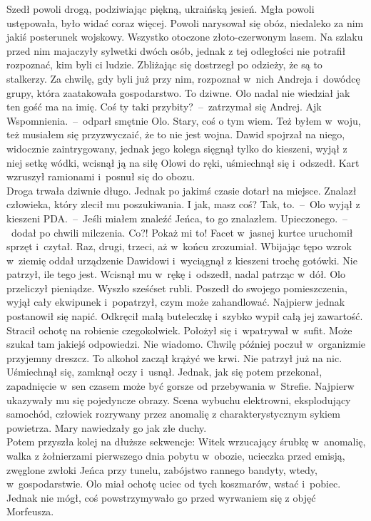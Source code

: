 \documentclass[../MAIN.tex]{subfiles}
\begin{document}
Szedł powoli drogą, podziwiając piękną, ukraińską jesień. Mgła powoli ustępowała, było widać coraz więcej. Powoli narysował się obóz, niedaleko za nim jakiś posterunek wojskowy. Wszystko otoczone złoto-czerwonym lasem. Na szlaku przed nim majaczyły sylwetki dwóch osób, jednak z tej odległości nie potrafił rozpoznać, kim byli ci ludzie. Zbliżając się dostrzegł po odzieży, że są to stalkerzy. Za chwilę, gdy byli już przy nim, rozpoznał w~nich Andreja i~dowódcę grupy, która zaatakowała gospodarstwo. To dziwne. Olo nadal nie wiedział jak ten gość ma na imię.
\sd
\xx Coś ty taki przybity?~--~zatrzymał się Andrej.
\xx Aj\3k Wspomnienia.~--~odparł smętnie Olo.
\xx Stary, coś o tym wiem. Też byłem w~woju, też musiałem się przyzwyczaić, że to nie jest wojna.
\qm
Dawid spojrzał na niego, widocznie zaintrygowany, jednak jego
kolega sięgnął tylko do kieszeni, wyjął z niej setkę wódki,
wcisnął ją na siłę Olowi do ręki, uśmiechnął się i~odszedł.
Kart wzruszył ramionami i~posnuł się do obozu.\\
Droga trwała dziwnie długo. Jednak po jakimś czasie dotarł na
miejsce. Znalazł człowieka, który zlecił mu poszukiwania.
\sd
\xx I jak, masz coś?
\xx Tak, to.~--~Olo wyjął z kieszeni PDA.~--~Jeśli miałem znaleźć Jeńca, to go znalazłem. Upieczonego.~--~dodał po chwili milczenia.
\xx Co?! Pokaż mi to!
\qm
Facet w~jasnej kurtce uruchomił sprzęt i~czytał. Raz, drugi, trzeci, aż w~końcu zrozumiał. Wbijając tępo wzrok w~ziemię oddał urządzenie Dawidowi i~wyciągnął z kieszeni trochę gotówki. Nie patrzył, ile tego jest. Wcisnął mu w~rękę i~odszedł, nadal patrząc w~dół. Olo przeliczył pieniądze. Wyszło sześćset rubli. Poszedł do swojego pomieszczenia, wyjął cały ekwipunek i~popatrzył, czym może zahandlować. Najpierw jednak postanowił się napić. Odkręcił małą buteleczkę i~szybko wypił całą jej zawartość. Stracił ochotę na robienie czegokolwiek. Położył się i~wpatrywał w~sufit. Może szukał tam jakiejś odpowiedzi. Nie wiadomo. Chwilę później poczuł w~organizmie przyjemny dreszcz. To alkohol zaczął krążyć we krwi. Nie patrzył już na nic. Uśmiechnął się, zamknął oczy i~usnął.
%
%
Jednak, jak się potem przekonał, zapadnięcie w~sen czasem może
być gorsze od przebywania w~Strefie. Najpierw ukazywały mu się
pojedyncze obrazy. Scena wybuchu elektrowni, eksplodujący
samochód, człowiek rozrywany przez anomalię z
charakterystycznym sykiem powietrza. Mary nawiedzały go jak złe
duchy.\\
Potem przyszła kolej na dłuższe sekwencje: Witek wrzucający
śrubkę w~anomalię, walka z żołnierzami pierwszego dnia pobytu
w~obozie, ucieczka przed emisją, zwęglone zwłoki Jeńca przy
tunelu, zabójstwo rannego bandyty, wtedy, w~gospodarstwie. Olo
miał ochotę uciec od tych koszmarów, wstać i~pobiec. Jednak nie
mógł, coś powstrzymywało go przed wyrwaniem się z objęć
Morfeusza.
\end{document}
